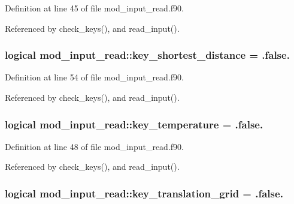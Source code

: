 Definition at line 45 of file mod\+\_\+input\+\_\+read.\+f90.



Referenced by check\+\_\+keys(), and read\+\_\+input().

\subsubsection[{\texorpdfstring{key\+\_\+shortest\+\_\+distance}{key_shortest_distance}}]{\setlength{\rightskip}{0pt plus 5cm}logical mod\+\_\+input\+\_\+read\+::key\+\_\+shortest\+\_\+distance = .false.}\hypertarget{namespacemod__input__read_a1956b5de5214082fc58fa663884d9fc8}{}\label{namespacemod__input__read_a1956b5de5214082fc58fa663884d9fc8}


Definition at line 54 of file mod\+\_\+input\+\_\+read.\+f90.



Referenced by check\+\_\+keys(), and read\+\_\+input().

\subsubsection[{\texorpdfstring{key\+\_\+temperature}{key_temperature}}]{\setlength{\rightskip}{0pt plus 5cm}logical mod\+\_\+input\+\_\+read\+::key\+\_\+temperature = .false.}\hypertarget{namespacemod__input__read_a119a4d5f6c8db10062bf46a95dc5ddfa}{}\label{namespacemod__input__read_a119a4d5f6c8db10062bf46a95dc5ddfa}


Definition at line 48 of file mod\+\_\+input\+\_\+read.\+f90.



Referenced by check\+\_\+keys(), and read\+\_\+input().

\subsubsection[{\texorpdfstring{key\+\_\+translation\+\_\+grid}{key_translation_grid}}]{\setlength{\rightskip}{0pt plus 5cm}logical mod\+\_\+input\+\_\+read\+::key\+\_\+translation\+\_\+grid = .false.}\hypertarget{namespacemod__input__read_a668e8b052b58c62bdcb1fde214459cb1}{}\label{namespacemod__input__read_a668e8b052b58c62bdcb1fde214459cb1}


